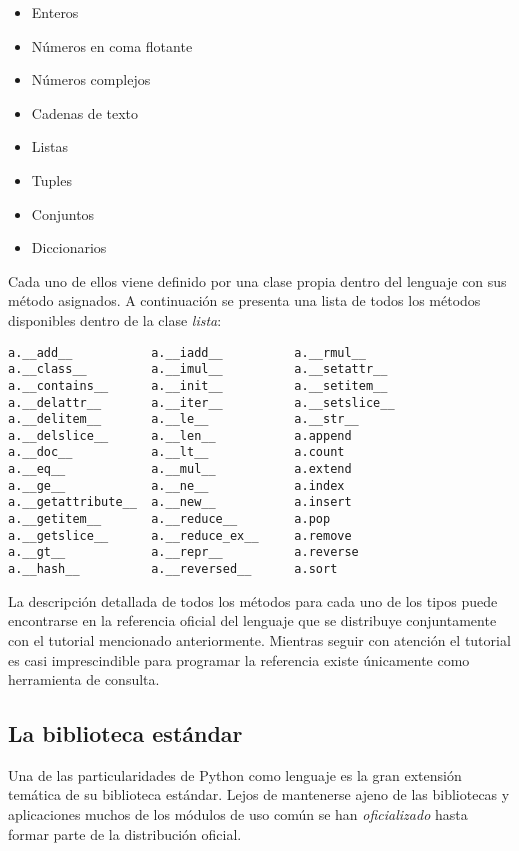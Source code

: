 \documentclass[a4paper,10pt]{article}
\begin{document}
\begin{itemize}
\item Enteros
\item Números en coma flotante
\item Números complejos
\item Cadenas de texto
\item Listas
\item Tuples
\item Conjuntos
\item Diccionarios
\end{itemize}

Cada uno de ellos viene definido por una clase propia dentro del
lenguaje con sus método asignados.  A continuación se presenta una
lista de todos los métodos disponibles dentro de la clase
\emph{lista}:

\begin{lstlisting}
a.__add__           a.__iadd__          a.__rmul__
a.__class__         a.__imul__          a.__setattr__
a.__contains__      a.__init__          a.__setitem__
a.__delattr__       a.__iter__          a.__setslice__
a.__delitem__       a.__le__            a.__str__
a.__delslice__      a.__len__           a.append
a.__doc__           a.__lt__            a.count
a.__eq__            a.__mul__           a.extend
a.__ge__            a.__ne__            a.index
a.__getattribute__  a.__new__           a.insert
a.__getitem__       a.__reduce__        a.pop
a.__getslice__      a.__reduce_ex__     a.remove
a.__gt__            a.__repr__          a.reverse
a.__hash__          a.__reversed__      a.sort
\end{lstlisting}

La descripción detallada de todos los métodos para cada uno de los
tipos puede encontrarse en la referencia oficial del lenguaje
\cite{REF} que se distribuye conjuntamente con el tutorial mencionado
anteriormente.  Mientras seguir con atención el tutorial es casi
imprescindible para programar la referencia existe únicamente como
herramienta de consulta.

\subsection{La biblioteca estándar}

Una de las particularidades de Python como lenguaje es la gran
extensión temática de su biblioteca estándar.  Lejos de mantenerse
ajeno de las bibliotecas y aplicaciones muchos de los módulos de uso
común se han \emph{oficializado} hasta formar parte de la distribución
oficial.
\end{document}
